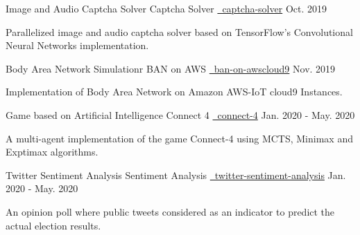 \begin{cventries}
   \cventry
    {Image and Audio Captcha Solver}
    {Captcha Solver}
    {\href{https://github.com/mukeshmk/image-audio-captcha}{\faGithubSquare\ captcha-solver}}
    {Oct. 2019}
    {
      \begin{cvitems}
        \item {Parallelized image and audio captcha solver based on TensorFlow’s Convolutional Neural Networks implementation.}
      \end{cvitems}
    }
  \cventry
    {Body Area Network Simulationr}
    {BAN on AWS}
    {\href{https://github.com/mukeshmk/ban-on-awscloud9}{\faGithubSquare\ ban-on-awscloud9}}
    {Nov. 2019}
    {
      \begin{cvitems}
        \item {Implementation of Body Area Network on Amazon AWS-IoT cloud9 Instances.}
      \end{cvitems}
    }
  \cventry
    {Game based on Artificial Intelligence}
    {Connect 4}
    {\href{https://github.com/mukeshmk/connect-4}{\faGithubSquare\ connect-4}}
    {Jan. 2020 - May. 2020}
    {
      \begin{cvitems}
        \item {A multi-agent implementation of the game Connect-4 using MCTS, Minimax and Exptimax algorithms.}
      \end{cvitems}
    }
  \cventry
    {Twitter Sentiment Analysis}
    {Sentiment Analysis}
    {\href{https://github.com/mukeshmk/twitter-sentiment-analysis}{\faGithubSquare\ twitter-sentiment-analysis}}
    {Jan. 2020 - May. 2020}
    {
      \begin{cvitems}
        \item {An opinion poll where public tweets considered as an indicator to predict the actual election results.}
      \end{cvitems}
    }
\end{cventries}
